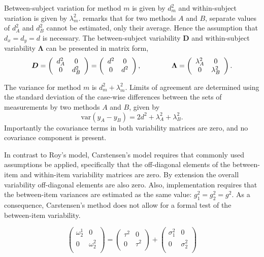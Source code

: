 \documentclass[12pt, a4paper]{report}
\theoremstyle{plain}
\theoremstyle{definition}
\theoremstyle{remark}
\begin{document}
Between-subject variation for method $m$ is given by $d^2_{m}$ and within-subject variation is given by $\lambda^2_{m}$.  \citet{BXC2008} remarks that for two methods $A$ and $B$, separate values of $d^2_{A}$ and $d^2_{B}$ cannot be estimated, only their average. Hence the assumption that $d_{x}= d_{y}= d$ is necessary. The between-subject variability $\boldsymbol{D}$ and within-subject variability $\boldsymbol{\Lambda}$ can be presented in matrix form,\[
\boldsymbol{D} = \left(%
\begin{array}{cc}
d^2_{A}& 0 \\
0 & d^2_{B} \\
\end{array}%
\right)=\left(%
\begin{array}{cc}
d^2& 0 \\
0 & d^2\\
\end{array}%
\right),
\hspace{1.5cm}
\boldsymbol{\Lambda} = \left(%
\begin{array}{cc}
\lambda^2_{A}& 0 \\
0 & \lambda^2_{B} \\
\end{array}%
\right).
\]

The variance for method $m$ is $d^2_{m}+\lambda^2_{m}$. Limits of agreement are determined using the standard deviation of the case-wise differences between the sets of measurements by two methods $A$ and $B$, given by
\begin{equation}
\mbox{var} (y_{A}-y_{B}) = 2d^2 + \lambda^2_{A}+ \lambda^2_{B}.
\end{equation}
Importantly the covariance terms in both variability matrices are zero, and no covariance component is present.





In contrast to Roy's model, Carstensen's model requires that commonly used assumptions be applied, specifically that the off-diagonal elements of the between-item and within-item variability matrices are zero. By
extension the overall variability off-diagonal elements are also zero. Also, implementation requires that the between-item variances are estimated as the same value: $g^2_1 = g^2_2 = g^2$.
As a consequence, Carstensen's method does not allow for a formal test of the between-item variability.

\[\left(\begin{array}{cc}
\omega^1_2  & 0 \\
0 & \omega^2_2 \\
\end{array}  \right)
=  \left(
\begin{array}{cc}
\tau^2  & 0 \\
0 & \tau^2 \\
\end{array} \right)+
\left(
\begin{array}{cc}
\sigma^2_1  & 0 \\
0 & \sigma^2_2 \\
\end{array}\right)
\]
\end{document}
